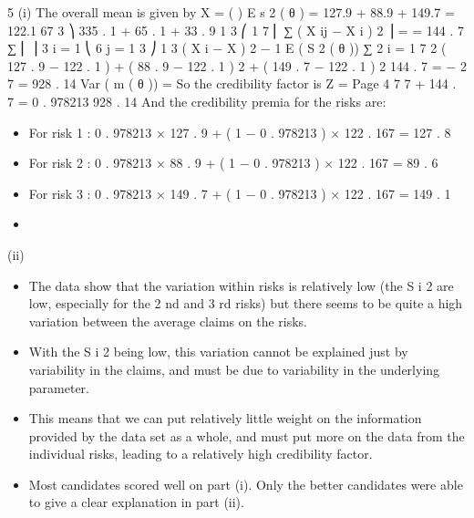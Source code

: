 \documentclass[a4paper,12pt]{article}
\begin{document}
5
(i)
The overall mean is given by X =
(
)
E s 2 ( θ ) =
127.9 + 88.9 + 149.7
= 122.1 67
3
⎞ 335 . 1 + 65 . 1 + 33 . 9
1 3 ⎛ 1 7
⎜ ∑ ( X ij − X i ) 2 ⎟ =
= 144 . 7
∑
⎜
⎟
3 i = 1 ⎝ 6 j = 1
3
⎠
1 3
( X i − X ) 2 − 1 E ( S 2 ( θ ))
∑
2 i = 1
7
2
( 127 . 9 − 122 . 1 ) + ( 88 . 9 − 122 . 1 ) 2 + ( 149 . 7 − 122 . 1 ) 2 144 . 7
=
−
2
7
= 928 . 14
Var ( m ( θ )) =
So the credibility factor is Z =
Page 4
7
7 + 144 . 7
= 0 . 978213
928 . 14
And the credibility premia for the risks are:
\begin{itemize}
\item For risk 1 : 0 . 978213 × 127 . 9 + ( 1 − 0 . 978213 ) × 122 . 167 = 127 . 8
\item For risk 2 : 0 . 978213 × 88 . 9 + ( 1 − 0 . 978213 ) × 122 . 167 = 89 . 6
\item For risk 3 : 0 . 978213 × 149 . 7 + ( 1 − 0 . 978213 ) × 122 . 167 = 149 . 1
\item 
\end{itemize}
(ii)
\begin{itemize}
\item The data show that the variation within risks is relatively low (the S i 2 are low, especially for the 2 nd and 3 rd risks) but there seems to be quite a high variation between the average claims on the risks.
\item With the S i 2 being low, this variation cannot be explained just by variability in the claims, and must be due to variability in the underlying parameter.
\item This means that we can put relatively little weight on the information provided by the data set as a whole, and must put more on the data from the individual risks, leading to a relatively high credibility factor.
\item Most candidates scored well on part (i). Only the better candidates were able to give a clear explanation in part (ii).
\end{itemize}
\end{document}
